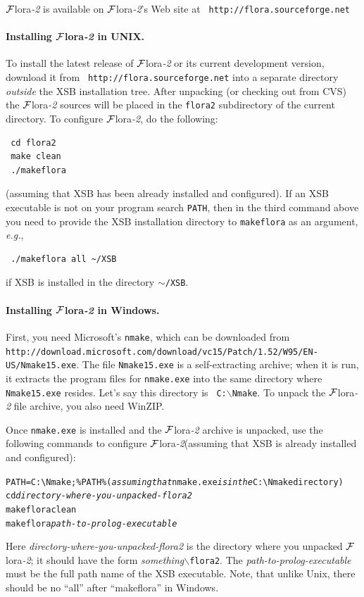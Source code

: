 \documentclass[11pt]{article}
\newcommand{\FLORA}{{\mbox{\sc ${\cal F}${lora}\rm\emph{-2}}}\xspace}
\begin{document}
\FLORA is available on \FLORA's Web site at {\tt
  http://flora.sourceforge.net}

\paragraph{Installing \FLORA in UNIX.}
To install the latest release
of \FLORA or its current development version, download it from {\tt
  http://flora.sourceforge.net} into a separate directory \emph{outside}
the XSB installation tree. After unpacking (or checking out from CVS) the
\FLORA sources will be placed in the {\tt flora2} subdirectory of the current
directory. To
configure \FLORA, do the following:
\begin{verbatim}
 cd flora2
 make clean
 ./makeflora
\end{verbatim}
(assuming that XSB has been already installed and configured).
If an XSB executable is not on your program search {\tt PATH}, then in the
third command above you
need to provide the XSB installation directory to {\tt makeflora} as
an argument, {\it e.g.},
\begin{verbatim}
 ./makeflora all ~/XSB  
\end{verbatim}
if XSB is installed in the directory {\tt $\sim$/XSB}. 

\paragraph{Installing \FLORA in Windows.}
First, you need Microsoft's {\tt nmake}, which can be downloaded from {\tt
  http://download.microsoft.com/download/vc15/Patch/1.52/W95/EN-US/Nmake15.exe}.
The file {\tt Nmake15.exe} is a self-extracting archive; when it is run, it
extracts the program files for {\tt nmake.exe} into the same directory
where {\tt Nmake15.exe} resides.  Let's say this directory is {\tt
  C:$\backslash$Nmake}.
To unpack the \FLORA file archive, you also need WinZIP.

Once {\tt nmake.exe} is installed and the \FLORA archive is unpacked,
use the following commands to configure
\FLORA (assuming that XSB is already installed and configured):
\begin{alltt}
   PATH=C:\verb|\|Nmake;\%PATH\%    ({\it assuming that} nmake.exe {\it is in the} C:\verb|\|Nmake directory)
   cd \emph{directory-where-you-unpacked-flora2}
   makeflora clean
   makeflora \emph{path-to-prolog-executable}
\end{alltt}
Here \emph{directory-where-you-unpacked-flora2} is the directory 
where you unpacked \FLORA; it should have the form
\emph{something}$\backslash${\tt flora2}. The
\emph{path-to-prolog-executable} must be the full path name of the XSB
executable. Note, that unlike Unix, there should be no ``all'' after
``makeflora'' in Windows.
\end{document}
